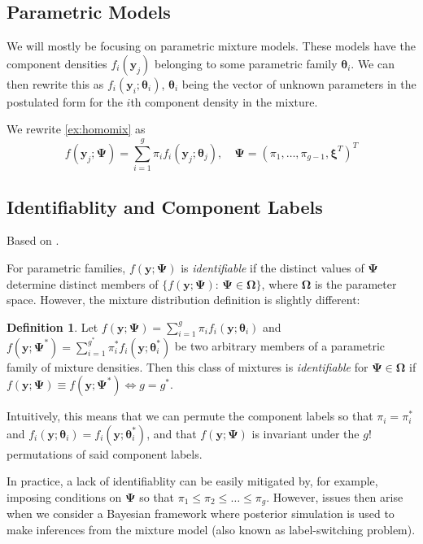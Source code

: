 \documentclass{article}\usepackage[]{graphicx}\usepackage[]{xcolor}
\theoremstyle{plain}
\theoremstyle{definition}
\newtheorem{definition}[theorem]{Definition}{}{}
\theoremstyle{remark}
\newcommand{\boldy}{\mathbf{y}}
\newcommand{\boldtheta}{\boldsymbol{\theta}}
\newcommand{\boldPsi}{\boldsymbol{\Psi}}
\newcommand{\boldxi}{\boldsymbol{\xi}}
\newcommand{\boldOmega}{\boldsymbol{\Omega}}
\begin{document}
\subsection{Parametric Models}

We will mostly be focusing on parametric mixture models. These models have the component densities $f_i(\boldy_j)$ belonging to some parametric family $\boldtheta_i$. We can then rewrite this as $f_i(\boldy_i; \boldtheta_i)$,   $\boldtheta_i$ being the vector of unknown parameters in the postulated form for the $i$th component density in the mixture.

We rewrite \eqref{ex:homomix} as
\begin{equation*}
    f(\boldy_j ; \boldPsi) = \sum_{i=1}^g \pi_i f_i(\boldy_j; \boldtheta_j), \quad  \boldPsi = (\pi_1, \dots, \pi_{g-1}, \boldxi^T)^T
\end{equation*}


\subsection{Identifiablity and Component Labels}
Based on \cite[Section 2.2]{annurev_FMMs}.

For parametric families, $f(\boldy; \boldPsi)$ is \textit{identifiable} if the distinct values of $\boldPsi$ determine distinct members of $\{f(\boldy; \boldPsi): \, \boldPsi \in \boldOmega\}$, where $\boldOmega$ is the parameter space. However, the mixture distribution definition is slightly different:
\begin{definition}
  Let $f(\boldy; \boldPsi) = \sum_{i=1}^g \pi_i f_i(\boldy; \boldtheta_i)$ and $f(\boldy; \boldPsi^*) = \sum_{i=1}^{g^*} \pi_i^* f_i(\boldy; \boldtheta_i^*)$ be two arbitrary members of a parametric family of mixture densities. Then this class of mixtures is \textit{identifiable} for $\boldPsi \in \boldOmega$ if $f(\boldy; \boldPsi) \equiv f(\boldy; \boldPsi^*) \iff g = g^*$.
\end{definition}
Intuitively, this means that we can permute the component labels so that $\pi_i = \pi_i^*$ and $f_i(\boldy; \boldtheta_i) = f_i(\boldy; \boldtheta_i^*)$, and that $f(\boldy; \boldPsi)$ is invariant under the $g!$ permutations of said component labels.

In practice, a lack of identifiablity can be easily mitigated by, for example, imposing conditions on $\boldPsi$ so that $\pi_1 \leq \pi_2 \leq \dots \leq \pi_g$. However, issues then arise when we consider a Bayesian framework where posterior simulation is used to make inferences from the mixture model (also known as label-switching problem).
\end{document}
